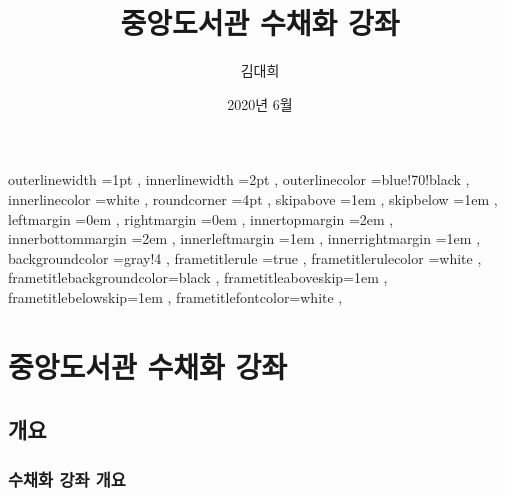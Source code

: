 \documentclass[12pt, a4paper, oneside]{book}
\let\stdsection\section
\renewcommand\section{\newpage\stdsection}
\begin{document}
	
			\dominitoc
			\doparttoc			




			\title{ 중앙도서관 수채화 강좌 }
			\author{김대희}
			\date{2020년 6월}
			\maketitle


			\tableofcontents 		%
			\cleardoublepage
			\listoftables 			%





		 {
						outerlinewidth		=1pt			,%
						innerlinewidth		=2pt			,%
						outerlinecolor		=blue!70!black	,%
						innerlinecolor		=white 			,%
						roundcorner			=4pt			,%
						skipabove			=1em 			,%
						skipbelow			=1em 			,%
						leftmargin			=0em			,%
						rightmargin			=0em			,%
						innertopmargin		=2em 			,%
						innerbottommargin 	=2em 			,%
						innerleftmargin		=1em 			,%
						innerrightmargin		=1em 			,%
						backgroundcolor		=gray!4			,%
						frametitlerule		=true 			,%
						frametitlerulecolor	=white			,%
						frametitlebackgroundcolor=black		,%
						frametitleaboveskip=1em 			,%
						frametitlebelowskip=1em 			,%
						frametitlefontcolor=white 			,%
						}



	\part{중앙도서관 수채화 강좌 }
	\noptcrule
	\parttoc				


	\chapter{개요}
	\noptcrule

	\newpage	
	\minitoc


%
	\section{ 수채화 강좌 개요}
\end{document}
